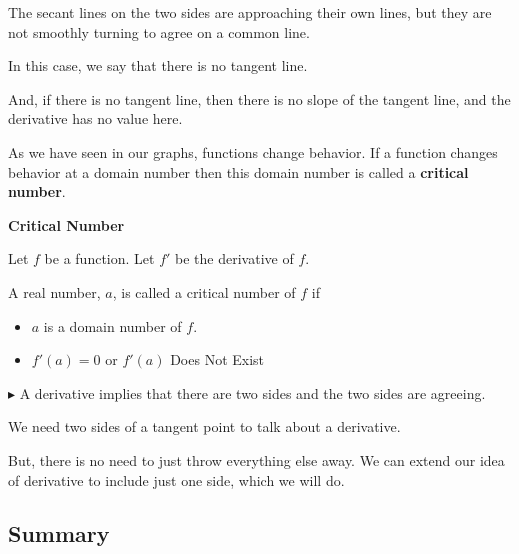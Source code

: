 \documentclass{ximera}
\begin{document}
The secant lines on the two sides are approaching their own lines, but they are not smoothly turning to agree on a common line. 


In this case, we say that there is no tangent line. 

And, if there is no tangent line, then there is no slope of the tangent line, and the derivative has no value here. 





As we have seen in our graphs, functions change behavior. If a function changes behavior at a domain number then this domain number is called a \textbf{critical number}.


\begin{definition} \textbf{\textcolor{green!50!black}{Critical Number}}

Let $f$ be a function.
Let $f'$ be the derivative of $f$.

A real number, $a$, is called a critical number of $f$ if

\begin{itemize}
\item $a$ is a domain number of $f$.
\item $f'(a) = 0$ or $f'(a)$ Does Not Exist
\end{itemize}

\end{definition}











\textbf{\textcolor{blue!55!black}{$\blacktriangleright$}} A derivative implies that there are two sides and the two sides are agreeing. 


We need two sides of a tangent point to talk about a derivative.

 
But, there is no need to just throw everything else away.  We can extend our idea of derivative to include just one side, which we will do. 



















\subsection*{Summary}
\end{document}
